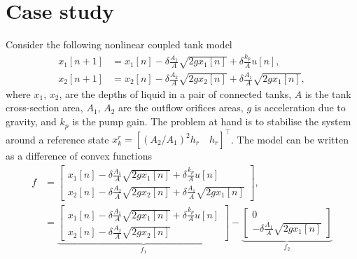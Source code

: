 \documentclass[a4paper, 10 pt, conference]{IEEEconf}
\begin{document}
\section{Case study}
\label{sec:case}
Consider the following nonlinear coupled tank model  
\begin{align*}
x_1[n+1] &= x_1[n] - \delta\frac{A_1}{A} \sqrt{2 g x_1[n]} + \delta\frac{k_p}{A} u[n],
\\
x_2[n+1] &= x_2[n] - \delta\frac{A_2}{A} \sqrt{2 g x_2[n]} + \delta\frac{A_1}{A} \sqrt{2 g x_1[n]}, 
\end{align*}
where $x_1$, $x_2$, are the depths of liquid in a pair of connected tanks, $A$ is the tank cross-section area, $A_1$, $A_2$ are the outflow orifices areas, $g$ is acceleration due to gravity, and $k_p$ is the pump gain. The problem at hand is to stabilise the system around a reference state $x^r_k = [(A_2/A_1)^2h_r \quad  h_r]^\top$.
%
The model can be written as a difference of convex functions
\begin{align*}
f &= \begin{bmatrix}
     x_1[n] - \delta\frac{A_1}{A} \sqrt{2 g x_1[n]} + \delta\frac{k_p}{A} u[n] \\
      x_2[n] - \delta\frac{A_2}{A} \sqrt{2 g x_2[n]} + \delta\frac{A_1}{A} \sqrt{2 g x_1[n]}
\end{bmatrix}, \\
& = \underbrace{\begin{bmatrix}
     x_1[n] \!-\! \delta\frac{A_1}{A} \sqrt{2 g x_1[n]} \!+\! \delta\frac{k_p}{A} u[n] \\
     x_2[n] \!-\! \delta\frac{A_2}{A} \sqrt{2 g x_2[n]}
\end{bmatrix}}_{f_1} - \underbrace{\begin{bmatrix}
     0 \\
     - \delta\frac{A_1}{A} \sqrt{2 g x_1[n]}
\end{bmatrix}}_{f_2}
\end{align*}
\end{document}
